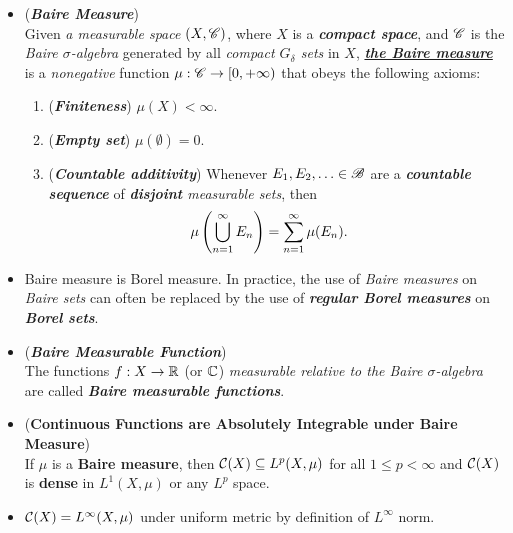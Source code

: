 \documentclass[11pt]{article}
\begin{document}
\begin{itemize}
\item \begin{definition} (\textbf{\emph{Baire Measure}})\\
Given \emph{a measurable space} $(X, {\mathscr C})$, where $X$ is a \emph{\textbf{compact space}}, and ${\mathscr C}$ is the \emph{Baire $\sigma$-algebra} generated by all \emph{compact $G_{\delta}$ sets} in $X$, \underline{\textbf{\emph{the Baire measure}}} is a \emph{nonegative} function $\mu: {\mathscr C} \rightarrow [0, +\infty)$ that obeys the following axioms:
\begin{enumerate}
\item (\emph{\textbf{Finiteness}}) $\mu(X) < \infty$.
\item (\emph{\textbf{Empty set}}) $\mu(\emptyset) = 0$.
\item (\emph{\textbf{Countable additivity}}) Whenever $E_1, E_2, \ldots \in {\mathscr B}$ are a \emph{\textbf{countable sequence}} of \emph{\textbf{disjoint} measurable sets}, then 
\begin{align*}
\mu\left(\bigcup_{n=1}^{\infty} E_n\right) &= \sum_{n=1}^{\infty} \mu(E_n).
\end{align*}
\end{enumerate}
\end{definition}

\item \begin{remark}
Baire measure is Borel measure. In practice, the use of \emph{Baire measures} on \emph{Baire sets} can often be replaced by the use of \emph{\textbf{regular Borel measures}} on \emph{\textbf{Borel sets}}. 
\end{remark}

\item \begin{definition} (\textbf{\emph{Baire Measurable Function}})\\
The functions $f: X \rightarrow {\mathbb R}$ (or  ${\mathbb C}$) \emph{measurable relative to the Baire $\sigma$-algebra} are called \emph{\textbf{Baire measurable functions}}. 
\end{definition}



\item \begin{theorem} (\textbf{Continuous Functions are Absolutely Integrable under Baire Measure})\citep{reed1980methods}\\
If $\mu$ is a \textbf{Baire measure}, then ${\mathcal C}(X) \subseteq L^{p}(X, \mu)$ for all $1\le p < \infty$  and ${\mathcal C}(X)$ is \textbf{dense} in $L^{1}(X, \mu)$ or any $L^{p}$ space.
\end{theorem}

\item \begin{remark}
${\mathcal C}(X) = L^{\infty}(X, \mu)$ under uniform metric by definition of $L^{\infty}$ norm.
\end{remark}
\end{itemize}
\end{document}
